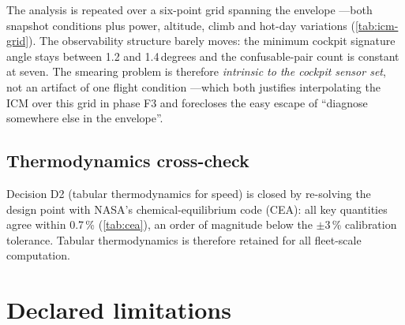 The analysis is repeated over a six-point grid spanning the envelope ---both snapshot
conditions plus power, altitude, climb and hot-day variations (\cref{tab:icm-grid}). The
observability structure barely moves: the minimum cockpit signature angle stays between 1.2 and
1.4\,degrees and the confusable-pair count is constant at seven. The smearing problem is
therefore \emph{intrinsic to the cockpit sensor set}, not an artifact of one flight condition
---which both justifies interpolating the ICM over this grid in phase F3 and forecloses the
easy escape of ``diagnose somewhere else in the envelope''.

\begin{table}[htbp]
  \centering\small
  \caption{Observability of the cockpit ICM across the operating-point grid. Auto-generated.}
  \label{tab:icm-grid}
  
\end{table}

\begin{table}[htbp]
  \centering\small
  \caption{Confusable fault pairs at cruise with cockpit sensors (signature angle
  $<15^{\circ}$). Auto-generated.}
  \label{tab:confusable}
  
\end{table}

\subsection{Thermodynamics cross-check}

Decision D2 (tabular thermodynamics for speed) is closed by re-solving the design point with
NASA's chemical-equilibrium code (CEA): all key quantities agree within
0.7\,\% (\cref{tab:cea}), an order of magnitude below the $\pm3$\,\% calibration tolerance.
Tabular thermodynamics is therefore retained for all fleet-scale computation.

\begin{table}[htbp]
  \centering\small
  \caption{Design point solved with tabular versus CEA thermodynamics. Auto-generated.}
  \label{tab:cea}
  
\end{table}

\section{Declared limitations}
\label{sec:limitations}

